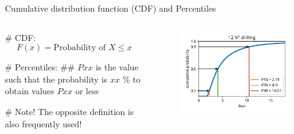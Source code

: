 \documentclass[12pt, aspectratio=149]{beamer}
\theoremstyle{plain}
\begin{document}
\begin{frame}[fragile]{Cumulative distribution function (CDF) and Percentiles}
\begin{columns}
	\begin{column}{0.5\textwidth}
		\begin{easylist}[itemize]
			# CDF:
			\begin{equation*}
				F(x) = \text{Probability of $X \leq x$}
			\end{equation*}
		
			# Percentiles:
			##  $Pxx$ is the value such that the probability is $xx$ \% to obtain values $Pxx$ or less

			# Note! The opposite definition is also frequently used!
		\end{easylist}
	\end{column}

	\begin{column}{0.5\textwidth}
		\begin{figure}
			\centering
			\includegraphics[width=0.99\linewidth]{figures/lognorm_cdf}
		\end{figure}
	\end{column}
\end{columns}
\end{frame}
\end{document}
